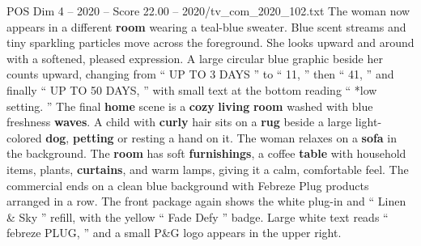 \begin{textsample}{POS Dim 4 – 2020 – Score 22.00 – 2020/tv\_com\_2020\_102.txt}
The woman now appears in a different \textbf{room} wearing a teal-blue sweater.
Blue scent streams and tiny sparkling particles move across the foreground.
She looks upward and around with a softened, pleased expression.
A large circular blue graphic beside her counts upward, changing from “ UP TO 3 DAYS ” to “ 11, ” then “ 41, ” and finally “ UP TO 50 DAYS, ” with small text at the bottom reading “ *low setting. ” The final \textbf{home} scene is a \textbf{cozy} \textbf{living} \textbf{room} washed with blue freshness \textbf{waves}.
A child with \textbf{curly} hair sits on a \textbf{rug} beside a large light-colored \textbf{dog}, \textbf{petting} or resting a hand on it.
The woman relaxes on a \textbf{sofa} in the background.
The \textbf{room} has soft \textbf{furnishings}, a coffee \textbf{table} with household items, plants, \textbf{curtains}, and warm lamps, giving it a calm, comfortable feel.
The commercial ends on a clean blue background with Febreze Plug products arranged in a row.
The front package again shows the white plug-in and “ Linen \& Sky ” refill, with the yellow “ Fade Defy ” badge.
Large white text reads “ febreze PLUG, ” and a small P\&G logo appears in the upper right.

\end{textsample}
